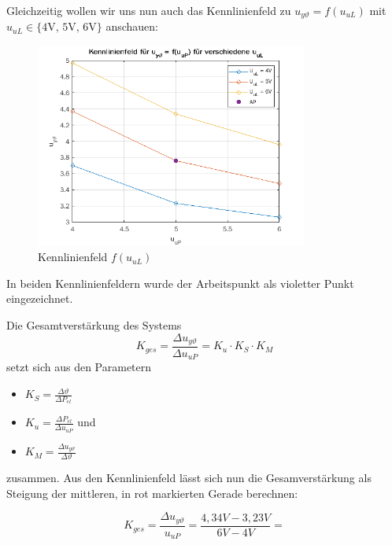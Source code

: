 \documentclass{report}
\begin{document}
Gleichzeitig wollen wir uns nun auch das Kennlinienfeld zu $u_{y\vartheta} = f(u_{uL})$ mit $u_{uL} \in \{\text{4V, 5V, 6V}\}$ anschauen:

\begin{figure}[h]
  \centering
  \includegraphics[width=0.8\textwidth]{../assets/images/RTP/kennlinieA12rtp1.png}
  \caption{Kennlinienfeld $f(u_{uL})$}
  \label{fig:kennux}
\end{figure}

In beiden Kennlinienfeldern wurde der Arbeitspunkt als violetter Punkt eingezeichnet.

Die Gesamtverstärkung des Systems
\begin{equation}
  \label{eq:11}
  K_{ges} = \frac{\Delta u_{y\vartheta}}{\Delta u_{uP}} = K_{u} \cdot K_{S} \cdot K_{M}
\end{equation}
setzt sich aus den Parametern

\begin{itemize}
  \item $K_{S} = \frac{\Delta \vartheta}{\Delta P_{el}}$

  \item $K_{u} = \frac{\Delta P_{el}}{\Delta u_{uP}}$ und
  \item $K_{M} = \frac{\Delta u_{y\vartheta}}{\Delta \vartheta}$
\end{itemize}
zusammen. Aus den Kennlinienfeld lässt sich nun die Gesamverstärkung als Steigung der mittleren, in rot markierten Gerade berechnen:

\begin{equation*}
  K_{ges} = \frac{\Delta u_{y\vartheta}}{u_{uP}} = \frac{4,34V - 3,23V}{6V-4V} =
\end{equation*}
\end{document}
